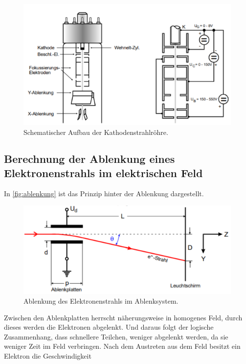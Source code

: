 \begin{figure}
    \centering
    \includegraphics[width=\textwidth]{images/bild1.png}
    \caption{Schematischer Aufbau der Kathodenstrahlröhre.}
    \label{fig:roehre}
\end{figure}

\subsection{Berechnung der Ablenkung eines Elektronenstrahls im elektrischen Feld}
\label{ssec:t2}

In \autoref{fig:ablenkung} ist das Prinzip hinter der Ablenkung dargestellt.

\begin{figure}
    \centering
    \includegraphics[width=\textwidth]{images/bild2.png}
    \caption{Ablenkung des Elektronenstrahls im Ablenksystem.}
    \label{fig:ablenkung}
\end{figure}

Zwischen den Ablenkplatten herrscht näherungsweise in homogenes Feld, durch dieses werden die Elektronen abgelenkt.
Und daraus folgt der logische Zusammenhang, dass schnellere Teilchen, weniger abgelenkt werden, da sie weniger Zeit im Feld verbringen.
Nach dem Austreten aus dem Feld besitzt ein Elektron die Geschwindigkeit


